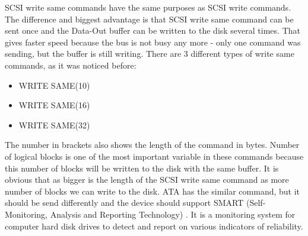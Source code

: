 SCSI write same commands have the same purposes as SCSI write commands. The difference and biggest advantage is that SCSI write same command can be sent once and the Data-Out buffer can be written to the disk several times. That gives faster speed because the bus is not busy any more - only one command was sending, but the buffer is still writing. 
There are 3 different types of write same commands, as it was noticed before:
\begin{itemize}%
	\setlength{\itemsep}{-2mm}
	\item WRITE SAME(10)
	\item WRITE SAME(16)
	\item WRITE SAME(32)
\end{itemize}
The number in brackets also shows the length of the command in bytes. Number of logical blocks is one of the most important variable in these commands because this number of blocks will be written to the disk with the same buffer. It is obvious that as bigger is the length of the SCSI write same command as more number of blocks we can write to the disk. ATA has the similar command, but it should be send differently and the device should support SMART (Self-Monitoring, Analysis and Reporting Technology) \cite{ata_spec}. It is a monitoring system for computer hard disk drives to detect and report on various indicators of reliability.





